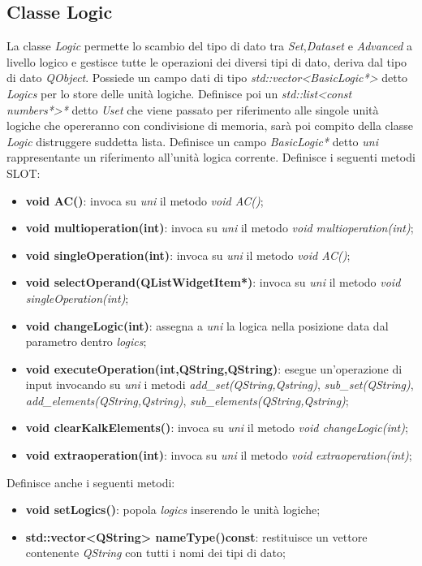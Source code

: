 \documentclass[a4paper,10pt]{article}
\begin{document}
        \subsection{Classe Logic}
        La classe \textit{Logic} permette lo scambio del tipo di dato tra \textit{Set},\textit{Dataset} e \textit{Advanced} a livello logico e gestisce tutte le operazioni dei diversi tipi di dato, deriva dal tipo di dato \textit{QObject}.
        Possiede un campo dati di tipo \textit{std::vector<BasicLogic*>} detto \textit{Logics} per lo store delle unità logiche.
        Definisce poi un \textit{std::list<const numbers*>*} detto \textit{Uset} che viene passato per riferimento alle singole unità logiche che opereranno con condivisione di memoria, sarà poi compito della classe \textit{Logic} distruggere suddetta lista.
        Definisce un campo \textit{BasicLogic*} detto \textit{uni} rappresentante un riferimento all'unità logica corrente.
        Definisce i seguenti metodi SLOT:
        \begin{itemize}
            \item \textbf{void AC()}: invoca su \textit{uni} il metodo \textit{void AC()};
            \item \textbf{void multioperation(int)}: invoca su \textit{uni} il metodo \textit{void multioperation(int)};
            \item \textbf{void singleOperation(int)}: invoca su \textit{uni} il metodo \textit{void AC()};
            \item \textbf{void selectOperand(QListWidgetItem*)}: invoca su \textit{uni} il metodo \textit{void singleOperation(int)};
            \item \textbf{void changeLogic(int)}: assegna a \textit{uni} la logica nella posizione data dal parametro dentro \textit{logics};
            \item \textbf{void executeOperation(int,QString,QString)}: esegue un'operazione di input invocando su \textit{uni} i metodi \textit{add\_set(QString,Qstring)}, \textit{sub\_set(QString)}, \textit{add\_elements(QString,Qstring)}, \textit{sub\_elements(QString,Qstring)};
            \item \textbf{void clearKalkElements()}: invoca su \textit{uni} il metodo \textit{void changeLogic(int)};
            \item \textbf{void extraoperation(int)}: invoca su \textit{uni} il metodo \textit{void extraoperation(int)};
        \end{itemize}
        Definisce anche i seguenti metodi:
        \begin{itemize}
            \item \textbf{void setLogics()}: popola \textit{logics} inserendo le unità logiche;
            \item \textbf{std::vector<QString> nameType()const}: restituisce un vettore contenente \textit{QString} con tutti i nomi dei tipi di dato;
        \end{itemize}
\end{document}
